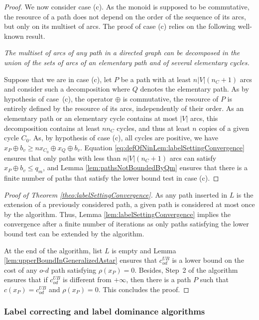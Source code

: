 \documentclass[11pt]{amsart}
\theoremstyle{plain}
\theoremstyle{remark}
\newcommand{\rplus}{\oplus}
\newcommand{\rleq}{\leqslant}
\newcommand{\rgeq}{\geqslant}
\newcommand{\rmeas}{\rho}
\newcommand{\re}{x}
\begin{document}
\begin{proof}
We now consider case (c). As the monoid is supposed to be commutative, the resource of a path does not depend on the order of the sequence of its arcs, but only on its multiset of arcs. The proof of case (c) relies on the following well-known result. 

{\em The multiset of arcs of any path in a directed graph can be decomposed in the union of the sets of arcs of an elementary path and of several elementary cycles. }

Suppose that we are in case (c), let $P$ be a path with at least $n|V|(n_{C} + 1)$ arcs and consider such a decomposition where $Q$ denotes the elementary path. As by hypothesis of case~(c), the operator $\rplus$ is commutative, the resource of $P$ is entirely defined by the resource of its arcs, independently of their order. As an elementary path or an elementary cycle contains at most $|V|$ arcs, this decomposition contains at least $nn_{C}$ cycles, and thus at least $n$ copies of a given cycle $C_{0}$. As, by hypothesis of case (c), all cycles are positive, we have $\re_{P} \rplus b_{v} \rgeq n\re_{C_{0}} \rplus \re_{Q} \rplus b_{v}$. Equation \ref{eq:defOfNinLem:labelSettingConvergence} ensures that only paths with less than $n|V|(n_{C}+1)$ arcs can satisfy $\re_{P} \rplus b_{v} \rleq q_{m}$, and Lemma \ref{lem:pathsNotBoundedByQm} ensures that there is a finite number of paths that satisfy the lower bound test in case (c).  
\end{proof}


\begin{proof}[Proof of Theorem \ref{theo:labelSettingConvergence}] As any path inserted in $L$ is the extension of a previously considered path, a given path is considered at most once by the algorithm. Thus, Lemma \ref{lem:labelSettingConvergence} implies the convergence after a finite number of iterations as only paths satisfying the lower bound test can be extended by the algorithm.

At the end of the algorithm, list $L$ is empty and Lemma \ref{lem:upperBoundInGeneralizedAstar} ensures that $c_{od}^{UB}$ is a lower bound on the cost of any $o$-$d$ path satisfying $\rmeas(\re_{P}) = 0$. Besides, Step~2 of the algorithm ensures that if $c_{od}^{UB}$ is different from $+\infty$, then there is a path $P$ such that $c(\re_{P}) = c_{od}^{UB}$ and $\rmeas(\re_{P}) = 0$. This concludes the proof.
\end{proof}

\subsubsection{Label correcting and label dominance algorithms} \label{ssub:label_correcting_algorithm}
\end{document}
